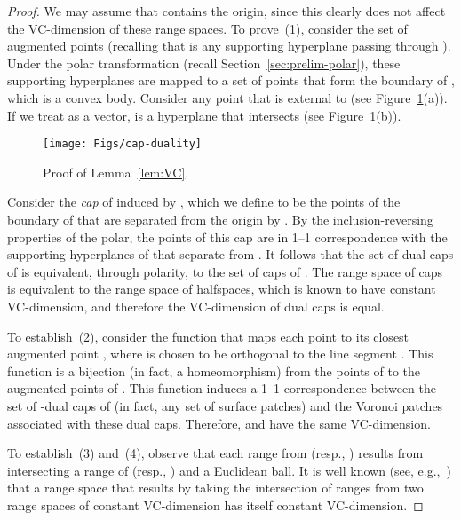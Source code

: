 \documentclass[11pt]{article}   \usepackage[letterpaper,hmargin=2.1cm,vmargin=3cm]{geometry}
\begin{document}
\begin{proof}
We may assume that  contains the origin, since this clearly does not affect the VC-dimension of these range spaces. To prove~(1), consider the set of augmented points  (recalling that  is any supporting hyperplane passing through ). Under the polar transformation (recall Section~\ref{sec:prelim-polar}), these supporting hyperplanes are mapped to a set of points that form the boundary of , which is a convex body. Consider any point  that is external to  (see Figure~\ref{fig:cap-duality}(a)). If we treat  as a vector,  is a hyperplane that intersects  (see Figure~\ref{fig:cap-duality}(b)). 

\begin{figure}[htbp]
  \centerline{\texttt{[image: Figs/cap-duality]}}
  \caption{Proof of Lemma~\ref{lem:VC}.}
  \label{fig:cap-duality}
\end{figure}


Consider the \emph{cap} of  induced by , which we define to be the points of the boundary of  that are separated from the origin by . By the inclusion-reversing properties of the polar, the points of this cap are in 1--1 correspondence with the supporting hyperplanes of  that separate  from . It follows that the set of dual caps of  is equivalent, through polarity, to the set of caps of . The range space of caps is equivalent to the range space of halfspaces, which is known to have constant VC-dimension, and therefore the VC-dimension of dual caps is equal.

To establish~(2), consider the function that maps each point  to its closest augmented point , where  is chosen to be orthogonal to the line segment . This function is a bijection (in fact, a homeomorphism) from the points of  to the augmented points of . This function induces a 1--1 correspondence between the set of -dual caps of  (in fact, any set of surface patches) and the Voronoi patches associated with these dual caps. Therefore,  and  have the same VC-dimension.
 
To establish~(3) and~(4), observe that each range from  (resp., ) results from intersecting a range of  (resp., ) and a Euclidean ball. It is well known (see, e.g.,~\cite{Mat02}) that a range space that results by taking the intersection of ranges from two range spaces of constant VC-dimension has itself constant VC-dimension.
\end{proof}


{\BallLemmaStmt*}
\end{document}

